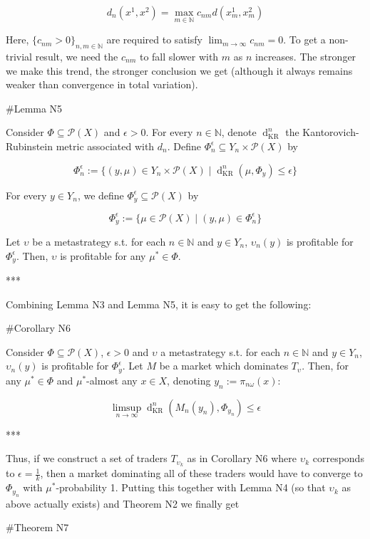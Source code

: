 \documentclass[a4paper]{article}
\newcommand{\Nats}{\mathbb{N}}
\newcommand{\Prob}{\mathcal{P}}
\newcommand{\Dkr}{\operatorname{d}_{\text{KR}}}
\begin{document}
$$d_n(x^1,x^2)= \max_{m \in \Nats} c_{nm} d(x^1_m,x^2_m)$$

Here, ${\{c_{nm} > 0\}_{n,m \in \Nats}}$ are required to satisfy ${\lim_{m \rightarrow \infty} c_{nm} = 0}$. To get a non-trivial result, we need the ${c_{nm}}$ to fall slower with ${m}$ as ${n}$ increases. The stronger we make this trend, the stronger conclusion we get (although it always remains weaker than convergence in total variation).

\#Lemma N5

Consider ${\Phi \subseteq \Prob(X)}$ and ${\epsilon > 0}$. For every ${n \in \Nats}$, denote ${\Dkr^n}$ the Kantorovich-Rubinstein metric associated with ${d_n}$. Define ${\Phi_n^\epsilon \subseteq Y_n \times \Prob(X)}$ by 

$$\Phi_n^\epsilon:=\{(y,\mu) \in Y_n \times \Prob(X) \mid \Dkr^n(\mu,\Phi_y) \leq \epsilon\}$$

For every ${y \in Y_n}$, we define ${\Phi^\epsilon_y \subseteq \Prob(X)}$ by

$$\Phi^\epsilon_y:=\{\mu \in \Prob(X) \mid (y,\mu) \in \Phi^\epsilon_n\}$$

Let ${\upsilon}$ be a metastrategy s.t. for each ${n \in \Nats}$ and ${y \in Y_n}$, ${\upsilon_n(y)}$ is profitable for ${\Phi^\epsilon_y}$. Then, ${\upsilon}$ is profitable for any ${\mu^* \in \Phi}$.

***

Combining Lemma N3 and Lemma N5, it is easy to get the following:

\#Corollary N6

Consider ${\Phi \subseteq \Prob(X)}$, ${\epsilon > 0}$ and ${\upsilon}$ a metastrategy s.t. for each ${n \in \Nats}$ and ${y \in Y_n}$, ${\upsilon_n(y)}$ is profitable for ${\Phi^\epsilon_y}$. Let ${M}$ be a market which dominates ${T_\upsilon}$. Then, for any ${\mu^* \in \Phi}$ and ${\mu^*}$-almost any ${x \in X}$, denoting ${y_n:=\pi_{n\omega}(x)}$:

$$\limsup_{n \rightarrow \infty} \Dkr^n(M_n(y_n),\Phi_{y_n}) \leq \epsilon$$

***

Thus, if we construct a set of traders ${T_{\upsilon_k}}$ as in Corollary N6 where ${\upsilon_k}$ corresponds to ${\epsilon=\frac{1}{k}}$, then a market dominating all of these traders would have to converge to ${\Phi_{y_n}}$ with ${\mu^*}$-probability 1. Putting this together with Lemma N4 (so that ${\upsilon_k}$ as above actually exists) and Theorem N2 we finally get

\#Theorem N7
\end{document}
